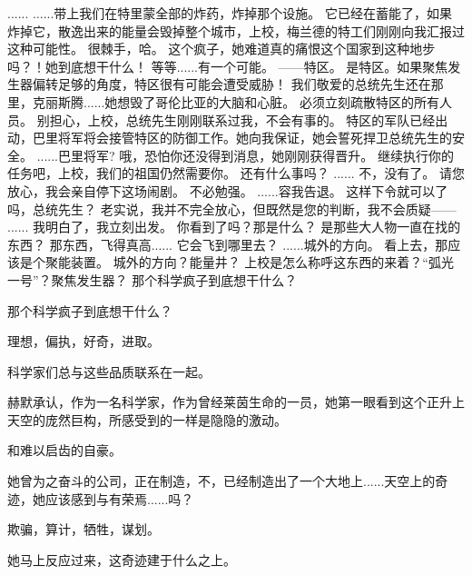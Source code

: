 \documentclass[openany]{book}
\begin{document}
\begin{dialogue}
     ......
     ......带上我们在特里蒙全部的炸药，炸掉那个设施。
     它已经在蓄能了，如果炸掉它，散逸出来的能量会毁掉整个城市，上校，梅兰德的特工们刚刚向我汇报过这种可能性。
     很棘手，哈。
     这个疯子，她难道真的痛恨这个国家到这种地步吗？！她到底想干什么！
     等等......有一个可能。
     ——特区。
     是特区。如果聚焦发生器偏转足够的角度，特区很有可能会遭受威胁！
     我们敬爱的总统先生还在那里，克丽斯腾......她想毁了哥伦比亚的大脑和心脏。
     必须立刻疏散特区的所有人员。
     别担心，上校，总统先生刚刚联系过我，不会有事的。
     特区的军队已经出动，巴里将军将会接管特区的防御工作。她向我保证，她会誓死捍卫总统先生的安全。
     ......巴里将军?
     哦，恐怕你还没得到消息，她刚刚获得晋升。
     继续执行你的任务吧，上校，我们的祖国仍然需要你。
     还有什么事吗？
     ......
     不，没有了。
     请您放心，我会亲自停下这场闹剧。
     不必勉强。
     ......容我告退。
     这样下令就可以了吗，总统先生？
     老实说，我并不完全放心，但既然是您的判断，我不会质疑——
     ......
     我明白了，我立刻出发。
     你看到了吗？那是什么？
     是那些大人物一直在找的东西？
     那东西，飞得真高......
     它会飞到哪里去？
     ......城外的方向。
     看上去，那应该是个聚能装置。
     城外的方向？能量井？
     上校是怎么称呼这东西的来着？“弧光一号”？聚焦发生器？
     那个科学疯子到底想干什么？
\end{dialogue}\par

那个科学疯子到底想干什么？\par
理想，偏执，好奇，进取。\par
科学家们总与这些品质联系在一起。\par
赫默承认，作为一名科学家，作为曾经莱茵生命的一员，她第一眼看到这个正升上天空的庞然巨构，所感受到的一样是隐隐的激动。\par
和难以启齿的自豪。\par
她曾为之奋斗的公司，正在制造，不，已经制造出了一个大地上......天空上的奇迹，她应该感到与有荣焉......吗？\par
欺骗，算计，牺牲，谋划。\par
她马上反应过来，这奇迹建于什么之上。
\end{document}
